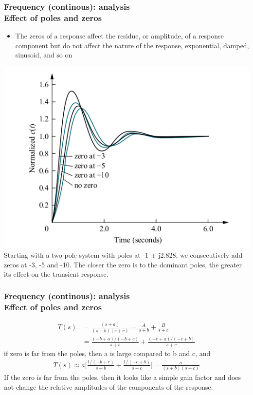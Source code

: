 \documentclass[hyperref={pdfpagelabels=true}]{beamer}
\begin{document}
\begin{frame}[shrink]
\frametitle{Frequency (continous): analysis \\ {\large Effect of poles and zeros}}
\begin{itemize}
\item The zeros of a response affect the residue, or amplitude,
of a response component but do not affect the nature of the
response, exponential, damped, sinusoid, and so on
\end{itemize}
\centering
\includegraphics[scale = .32]{figs/Selection_033.png} \\
Starting with a two-pole system with poles at -1 $\pm$ j2.828, we
consecutively add zeros at -3, -5 and -10. The closer the zero is to the
dominant poles, the greater its effect on the transient response.
\end{frame}

\begin{frame}[shrink]
\frametitle{Frequency (continous): analysis \\ {\large Effect of poles and zeros}}
\begin{align*}
T(s)&=\frac{(s+a)}{(s+b)(s+c)}=\frac{A}{s+b}+\frac{B}{s+c} \\
&=\frac{(-b+a)/(-b+c)}{s+b} + \frac{(-c+a)/(-c+b)}{s+c}
\end{align*}
if zero is far from the poles, then a is large compared to b and c, and
\begin{align*}
T(s) \approx a \Bigg [ \frac{1/(-b+c)}{s+b} + \frac{1/(-c+b)}{s+c} \Bigg] = \frac{a}{(s+b)(s+c)} 
\end{align*}
If the zero is far from the poles, then it looks like a simple gain factor
and does not change the relative amplitudes of the components of the
response.
\end{frame}
\end{document}
